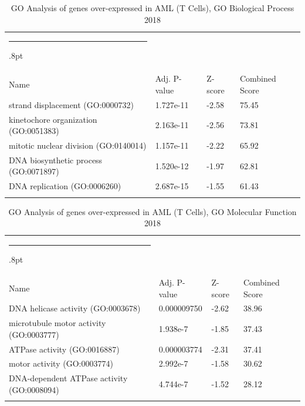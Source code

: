 \documentclass[3p,authoryear,preprint,12pt]{elsarticle}
\makeatletter
\def\hlinewd#1{%
  \noalign{\ifnum0=`}\fi\hrule \@height #1%
  \futurelet\reserved@a\@xhline}
\def\tbltoprule{\hlinewd{.8pt}\\[-12pt]}
\def\tblbottomrule{\noalign{\vspace*{6pt}}\hline\noalign{\vspace*{2pt}}}
\def\tblmidrule{\noalign{\vspace*{6pt}}\hline\noalign{\vspace*{2pt}}}
\makeatother
\begin{document}
\begin{table}[!htbp]
	\caption{{GO Analysis of genes over-expressed in AML (T Cells), GO Biological Process 2018} }
	\label{tw-de478ae31nc6}
	\def\arraystretch{1}
	\ignorespaces 
	\centering 
	\begin{tabulary}{\linewidth}{p{\dimexpr.65\tabcolsep}p{\dimexpr.15\tabcolsep}p{\dimexpr.1\tabcolsep}p{\dimexpr.1\tabcolsep}}
		\tbltoprule Name & Adj. P-value & Z-score & Combined Score\\
		\tblmidrule
strand displacement (GO:0000732) & 1.727e-11 & -2.58 & 75.45 \\
kinetochore organization (GO:0051383) & 2.163e-11 & -2.56 & 73.81 \\
mitotic nuclear division (GO:0140014) & 1.157e-11 & -2.22 & 65.92 \\
DNA biosynthetic process (GO:0071897) & 1.520e-12 & -1.97 & 62.81 \\
DNA replication (GO:0006260) & 2.687e-15 & -1.55 & 61.43 \\
		\tblbottomrule
	\end{tabulary}\par 
\end{table}
\begin{table}[!htbp]
	\caption{{GO Analysis of genes over-expressed in AML (T Cells), GO Molecular Function 2018} }
	\label{tw-de478ae31oc6}
	\def\arraystretch{1}
	\ignorespaces 
	\centering 
	\begin{tabulary}{\linewidth}{p{\dimexpr.65\tabcolsep}p{\dimexpr.15\tabcolsep}p{\dimexpr.1\tabcolsep}p{\dimexpr.1\tabcolsep}}
		\tbltoprule Name & Adj. P-value & Z-score & Combined Score\\
		\tblmidrule
DNA helicase activity (GO:0003678) & 0.000009750 & -2.62 & 38.96 \\
microtubule motor activity (GO:0003777) & 1.938e-7 & -1.85 & 37.43 \\
ATPase activity (GO:0016887) & 0.000003774 & -2.31 & 37.41 \\
motor activity (GO:0003774) & 2.992e-7 & -1.58 & 30.62 \\
DNA-dependent ATPase activity (GO:0008094) & 4.744e-7 & -1.52 & 28.12 \\
		\tblbottomrule
	\end{tabulary}\par 
\end{table}
\end{document}
